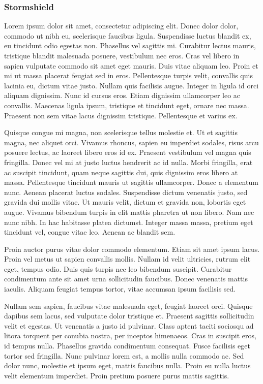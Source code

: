 \documentclass[a4paper,12pt]{report}
\begin{document}
\subsubsection{Stormshield} %
Lorem ipsum dolor sit amet, consectetur adipiscing elit. Donec dolor dolor, commodo ut nibh eu, scelerisque faucibus ligula. Suspendisse luctus blandit ex, eu tincidunt odio egestas non. Phasellus vel sagittis mi. Curabitur lectus mauris, tristique blandit malesuada posuere, vestibulum nec eros. Cras vel libero in sapien vulputate commodo sit amet eget mauris. Duis vitae aliquam leo. Proin et mi ut massa placerat feugiat sed in eros. Pellentesque turpis velit, convallis quis lacinia eu, dictum vitae justo. Nullam quis facilisis augue. Integer in ligula id orci aliquam dignissim. Nunc id cursus eros. Etiam dignissim ullamcorper leo ac convallis. Maecenas ligula ipsum, tristique et tincidunt eget, ornare nec massa. Praesent non sem vitae lacus dignissim tristique. Pellentesque et varius ex.

Quisque congue mi magna, non scelerisque tellus molestie et. Ut et sagittis magna, nec aliquet orci. Vivamus rhoncus, sapien eu imperdiet sodales, risus arcu posuere lectus, ac laoreet libero eros id ex. Praesent vestibulum vel magna quis fringilla. Donec vel mi at justo luctus hendrerit ac id nulla. Morbi fringilla, erat ac suscipit tincidunt, quam neque sagittis dui, quis dignissim eros libero at massa. Pellentesque tincidunt mauris ut sagittis ullamcorper. Donec a elementum nunc. Aenean placerat luctus sodales. Suspendisse dictum venenatis justo, sed gravida dui mollis vitae. Ut mauris velit, dictum et gravida non, lobortis eget augue. Vivamus bibendum turpis in elit mattis pharetra ut non libero. Nam nec nunc nibh. In hac habitasse platea dictumst. Integer massa massa, pretium eget tincidunt vel, congue vitae leo. Aenean ac blandit sem.

Proin auctor purus vitae dolor commodo elementum. Etiam sit amet ipsum lacus. Proin vel metus ut sapien convallis mollis. Nullam id velit ultricies, rutrum elit eget, tempus odio. Duis quis turpis nec leo bibendum suscipit. Curabitur condimentum ante sit amet urna sollicitudin faucibus. Donec venenatis mattis iaculis. Aliquam feugiat tempus tortor, vitae accumsan ipsum facilisis sed.

Nullam sem sapien, faucibus vitae malesuada eget, feugiat laoreet orci. Quisque dapibus sem lacus, sed vulputate dolor tristique et. Praesent sagittis sollicitudin velit et egestas. Ut venenatis a justo id pulvinar. Class aptent taciti sociosqu ad litora torquent per conubia nostra, per inceptos himenaeos. Cras in suscipit eros, id tempus nulla. Phasellus gravida condimentum consequat. Fusce facilisis eget tortor sed fringilla. Nunc pulvinar lorem est, a mollis nulla commodo ac. Sed dolor nunc, molestie et ipsum eget, mattis faucibus nulla. Proin eu nulla luctus velit elementum imperdiet. Proin pretium posuere purus mattis sagittis.
\end{document}
